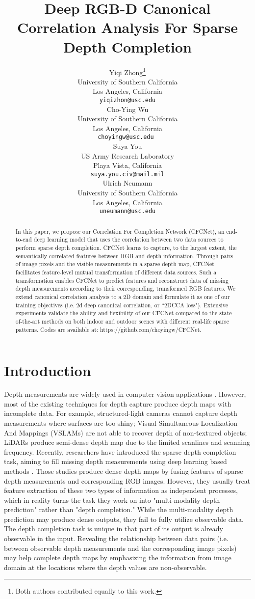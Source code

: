 \documentclass{article}
\title{Deep RGB-D Canonical Correlation Analysis For Sparse Depth Completion}
\author{Yiqi Zhong\thanks{Both authors contributed equally to this work.} \\
  University of Southern California\\
  Los Angeles, California \\
  \texttt{yiqizhon@usc.edu} \\
  \And
  Cho-Ying Wu\footnotemark[1]\\
  University of Southern California\\
  Los Angeles, California \\
  \texttt{choyingw@usc.edu } \\
  \And
  Suya You \\
  US Army Research Laboratory\\
  Playa Vista, California \\
  \texttt{suya.you.civ@mail.mil} \\
  \And
  Ulrich Neumann\\
  University of Southern California\\
  Los Angeles, California \\
  \texttt{uneumann@usc.edu} \\
}
\begin{document}
\maketitle

\begin{abstract}


In this paper, we propose our Correlation For Completion Network (CFCNet), an end-to-end deep learning model that uses the correlation between two data sources to perform sparse depth completion. CFCNet learns to capture, to the largest extent, the semantically correlated features between RGB and depth information. Through pairs of image pixels and the visible measurements in a sparse depth map, CFCNet facilitates feature-level mutual transformation of different data sources. Such a transformation enables CFCNet to predict features and reconstruct data of missing depth measurements according to their corresponding, transformed RGB features. We extend canonical correlation analysis to a 2D domain and formulate it as one of our training objectives (i.e. 2d deep canonical correlation, or “2DCCA loss"). Extensive experiments  validate the ability and flexibility of our CFCNet compared to the state-of-the-art methods on both indoor and outdoor scenes with different real-life sparse patterns. Codes are available at: https://github.com/choyingw/CFCNet.
\end{abstract}
\section{Introduction}

Depth measurements are widely used in computer vision applications \cite{tateno2017cnn,wang2018depth,NIPS2019_8340}. However, most of the existing techniques for depth capture produce depth maps with incomplete data. For example, structured-light cameras cannot capture depth measurements where surfaces are too shiny; Visual Simultaneous Localization And Mappings (VSLAMs) are not able to recover depth of non-textured objects; LiDARs produce semi-dense depth map due to the limited scanlines and scanning frequency. Recently, researchers have introduced the sparse depth completion task, aiming to fill missing depth measurements using deep learning based methods \cite{Ma2017SparseToDense,shivakumar2019dfusenet,uhrig2017sparsity,qiu2018deeplidar, chen2018estimating,yang2019dense,zhang2019dfinenet}. Those studies produce dense depth maps by fusing features of sparse depth measurements and corresponding RGB images. However, they usually treat feature extraction of these two types of information as independent processes, which in reality turns the task they work on into "multi-modality depth prediction" rather than "depth completion." While the multi-modality depth prediction may produce dense outputs, they fail to fully utilize observable data. The depth completion task is unique in that part of its output is already observable in the input. Revealing the relationship between data pairs (i.e. between observable depth measurements and the corresponding image pixels) may help complete depth maps by emphasizing the information from image domain at the locations where the depth values are non-observable.
\end{document}
